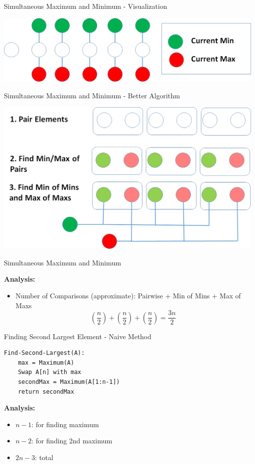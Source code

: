 \documentclass{beamer}
\begin{document}
\begin{frame}{Simultaneous Maximum and Minimum - Visualization}
\begin{center}
    \includegraphics[scale=0.4]{simMinMaxEg1.png}
\end{center}
\end{frame}


\begin{frame}{Simultaneous Maximum and Minimum - Better Algorithm}
\begin{center}
    \includegraphics[scale=0.4]{simMinMaxEg2.png}
\end{center}
\end{frame}





\begin{frame}{Simultaneous Maximum and Minimum}

{\bf Analysis:}
\pause
\begin{itemize}
\item Number of Comparisons (approximate): Pairwise + Min of Mins + Max of Maxs
$$(\frac{n}{2}) + (\frac{n}{2}) + (\frac{n}{2})  = \frac{3n}{2}$$
\end{itemize}
\end{frame}




\begin{frame}[fragile]{Finding Second Largest Element - Naive Method}
\pause
\begin{verbatim}
Find-Second-Largest(A):
    max = Maximum(A)
    Swap A[n] with max 
    secondMax = Maximum(A[1:n-1])
    return secondMax
\end{verbatim}
{\bf Analysis:} 
\pause 
\begin{itemize}
\item $n-1$: for finding maximum 
\item $n-2$: for finding 2nd maximum 
\item $2n-3$: total
\end{itemize}

\end{frame}
\end{document}
